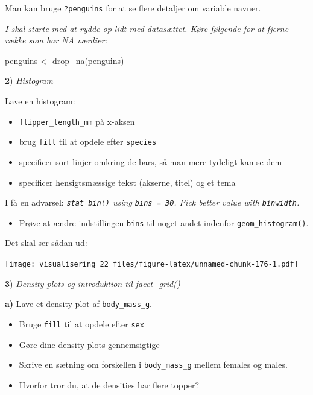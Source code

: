 \documentclass[
]{book}
\newenvironment{Shaded}{\begin{snugshade}}{\end{snugshade}}
\newcommand{\FunctionTok}[1]{\textcolor[rgb]{0.00,0.00,0.00}{#1}}
\newcommand{\NormalTok}[1]{#1}
\newcommand{\OtherTok}[1]{\textcolor[rgb]{0.56,0.35,0.01}{#1}}
\providecommand{\tightlist}{%
  \setlength{\itemsep}{0pt}\setlength{\parskip}{0pt}}
\begin{document}
Man kan bruge \texttt{?penguins} for at se flere detaljer om variable navner.

\emph{I skal starte med at rydde op lidt med datasættet. Køre følgende for at fjerne række som har NA værdier:}

\begin{Shaded}
\begin{Highlighting}[]
\NormalTok{penguins }\OtherTok{\textless{}{-}} \FunctionTok{drop\_na}\NormalTok{(penguins)}
\end{Highlighting}
\end{Shaded}

\textbf{2}) \emph{Histogram}

Lave en histogram:

\begin{itemize}
\tightlist
\item
  \texttt{flipper\_length\_mm} på x-aksen
\item
  brug \texttt{fill} til at opdele efter \texttt{species}
\item
  specificer sort linjer omkring de bars, så man mere tydeligt kan se dem
\item
  specificer hensigtsmæssige tekst (akserne, titel) og et tema
\end{itemize}

I få en advarsel: \emph{\texttt{stat\_bin()} using \texttt{bins\ =\ 30}. Pick better value with \texttt{binwidth}.}

\begin{itemize}
\tightlist
\item
  Prøve at ændre indstillingen \texttt{bins} til noget andet indenfor \texttt{geom\_histogram()}.
\end{itemize}

Det skal ser sådan ud:

\texttt{[image: visualisering\_22\_files/figure-latex/unnamed-chunk-176-1.pdf]}

\textbf{3}) \emph{Density plots og introduktion til facet\_grid()}

\textbf{a)} Lave et density plot af \texttt{body\_mass\_g}.

\begin{itemize}
\tightlist
\item
  Bruge \texttt{fill} til at opdele efter \texttt{sex}
\item
  Gøre dine density plots gennemsigtige
\item
  Skrive en sætning om forskellen i \texttt{body\_mass\_g} mellem females og males.
\item
  Hvorfor tror du, at de densities har flere topper?
\end{itemize}
\end{document}
